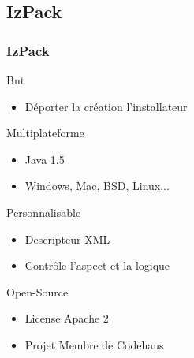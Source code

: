 \subsection{IzPack}
\begin{frame}\frametitle{IzPack}
\begin{minipage}[c]{.46\linewidth}
	\begin{beamerboxesrounded}[shadow=true]{But}
		\begin{itemize}
		\item Déporter la création l'installateur
		\end{itemize}
	\end{beamerboxesrounded}
\end{minipage}
\hfill
\begin{minipage}[c]{.46\linewidth}
	\begin{beamerboxesrounded}[shadow=true]{Multiplateforme}
		\begin{itemize}
		\item Java 1.5
		\item Windows, Mac, BSD, Linux...
		\end{itemize}
	\end{beamerboxesrounded}
\end{minipage}
\vfill
\begin{minipage}[c]{.46\linewidth}
	\begin{beamerboxesrounded}[shadow=true]{Personnalisable}
		\begin{itemize}
		\item Descripteur XML
		\item Contrôle l'aspect et la logique
		\end{itemize}
	\end{beamerboxesrounded}
\end{minipage}
\hfill
\begin{minipage}[c]{.46\linewidth}
	\begin{beamerboxesrounded}[shadow=true]{Open-Source}
		\begin{itemize}
		\item License Apache 2
		\item Projet Membre de Codehaus
		\end{itemize}
	\end{beamerboxesrounded}
\end{minipage}
\end{frame}
